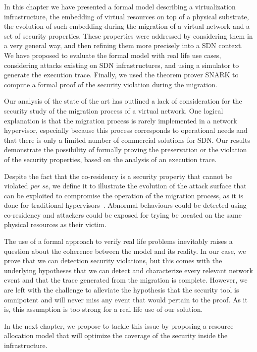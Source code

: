 In this chapter we have presented a formal model describing a virtualization infrastructure, the embedding of virtual resources on top of a physical substrate, the evolution of such embedding during the migration of a virtual network and a set of security properties. These properties were addressed by considering them in a very general way, and then refining them more precisely into a SDN context. We have proposed to evaluate the formal model with real life use cases, considering attacks existing on SDN infrastructures, and using a simulator to generate the execution trace. Finally, we used the theorem prover SNARK to compute a formal proof of the security violation during the migration.

Our analysis of the state of the art has outlined a lack of consideration for the security study of the migration process of a virtual network.
One logical explanation is that the migration process is rarely implemented in a network hypervisor, especially because this process corresponds to operational needs and that there is only a limited number of commercial solutions for SDN.
Our results demonstrate the possibility of formally proving the preservation or the violation of the security properties, based on the analysis of an execution trace.

Despite the fact that the co-residency is a security property that cannot be violated \textit{per se}, we define it to illustrate the evolution of the attack surface that can be exploited to compromise the operation of the migration process, as it is done for traditional hypervisors~\cite{stalling-atya2017,malicious-atya2017}.
Abnormal behaviours could be detected using co-residency and attackers could be exposed for trying be located on the same physical resources as their victim. 

The use of a formal approach to verify real life problems inevitably raises a question about the coherence between the model and its reality.
In our case, we prove that we can detection security violations, but this comes with the underlying hypotheses that we can detect and characterize every relevant network event and that the trace generated from the migration is complete. However, we are left with the challenge to alleviate the hypothesis that the security tool is omnipotent and will never miss any event that would pertain to the proof. As it is, this assumption is too strong for a real life use of our solution.

In the next chapter, we propose to tackle this issue by proposing a resource allocation model that will optimize the coverage of the security inside the infrastructure.